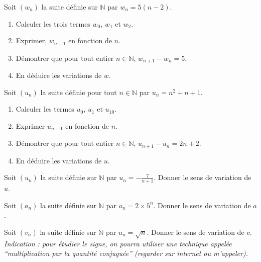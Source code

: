 \documentclass[11pt]{article}
\begin{document}
\noindent\begin{minipage}[]{.48\textwidth}
\begin{exo}
  Soit $(w_n)$ la suite définie sur $\mathbb{N}$ par $w_n = 5(n-2)$.
\begin{enumerate}
    \item Calculer les trois termes $w_0$, $w_1$ et $w_2$.
    \item Exprimer, $w_{n+1}$ en fonction de $n$.
    \item Démontrer que pour tout entier $n \in \mathbb{N}$, $w_{n+1} - w_n = 5$.
    \item En déduire les variations de $w$.
\end{enumerate}
\end{exo}
\end{minipage}
\hfill
\begin{minipage}[]{.48\textwidth}
\begin{exo}
  Soit $(u_n)$ la suite définie pour tout $n \in \mathbb{N}$ par $u_n = n^2+n+1$.
\begin{enumerate}
    \item Calculer les termes $u_0$, $u_1$ et $u_{10}$.
    \item Exprimer $u_{n+1}$ en fonction de $n$.
    \item Démontrer que pour tout entier $n \in \mathbb{N}$, $u_{n+1} - u_n =
      2n+2.$
    \item En déduire les variations de $u$.
\end{enumerate}
\end{exo}
\end{minipage}

\begin{exo}
  Soit $(u_n)$ la suite définie sur $\mathbb{N}$ par $u_n=-\frac{7}{n+1}$. Donner
  le sens de variation de $u$.
\end{exo}

\begin{exo}
  Soit $(a_n)$ la suite définie sur $\mathbb{N}$ par $a_n=2\times5^n$. Donner
  le sens de variation de $a$.
\end{exo}

\begin{exo}[$\star$]
  Soit $(v_n)$ la suite définie sur $\mathbb{N}$ par $u_n=\sqrt{n}$. Donner
  le sens de variation de $v$. \emph{Indication : pour étudier le signe, on
  pourra utiliser une technique appelée ``multiplication par la quantité
  conjuguée'' (regarder sur internet ou m'appeler).}
\end{exo}
\end{document}

